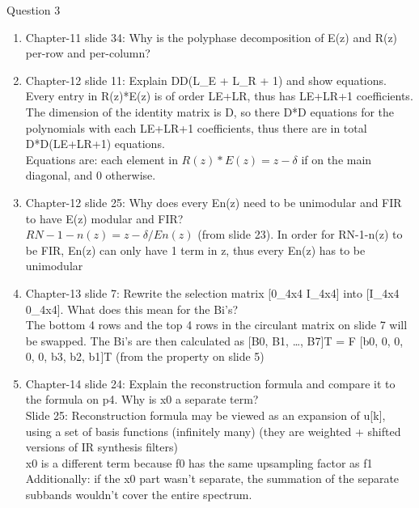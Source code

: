 \documentclass[
  a4paper,
  ,captions=tableheading
]{scrartcl}
\providecommand{\tightlist}{%
  \setlength{\itemsep}{0pt}\setlength{\parskip}{0pt}}
\begin{document}
Question 3

\begin{enumerate}
\def\labelenumi{\arabic{enumi}.}
\tightlist
\item
  Chapter-11 slide 34: Why is the polyphase decomposition of E(z) and
  R(z) per-row and per-column?\\
\item
  Chapter-12 slide 11: Explain DD(L\_E + L\_R + 1) and show equations.\\
  Every entry in R(z)*E(z) is of order LE+LR, thus has LE+LR+1
  coefficients. The dimension of the identity matrix is D, so there D*D
  equations for the polynomials with each LE+LR+1 coefficients, thus
  there are in total D*D(LE+LR+1) equations.\\
  Equations are: each element in \(R(z)*E(z) = z-\delta\) if on the main
  diagonal, and 0 otherwise.\\
\item
  Chapter-12 slide 25: Why does every En(z) need to be unimodular and
  FIR to have E(z) modular and FIR?\\
  \(RN-1-n(z)= z-\delta / En(z)\) (from slide 23). In order for
  RN-1-n(z) to be FIR, En(z) can only have 1 term in z, thus every En(z)
  has to be unimodular\\
\item
  Chapter-13 slide 7: Rewrite the selection matrix {[}0\_4x4 I\_4x4{]}
  into {[}I\_4x4 0\_4x4{]}. What does this mean for the Bi's?\\
  The bottom 4 rows and the top 4 rows in the circulant matrix on slide
  7 will be swapped. The Bi's are then calculated as {[}B0, B1, \ldots,
  B7{]}T = F {[}b0, 0, 0, 0, 0, b3, b2, b1{]}T (from the property on
  slide 5)\\
\item
  Chapter-14 slide 24: Explain the reconstruction formula and compare it
  to the formula on p4. Why is x0 a separate term?\\
  Slide 25: Reconstruction formula may be viewed as an expansion of
  u{[}k{]}, using a set of basis functions (infinitely many) (they are
  weighted + shifted versions of IR synthesis filters)\\
  x0 is a different term because f0 has the same upsampling factor as
  f1\\
  Additionally: if the x0 part wasn't separate, the summation of the
  separate subbands wouldn't cover the entire spectrum.
\end{enumerate}
\end{document}
